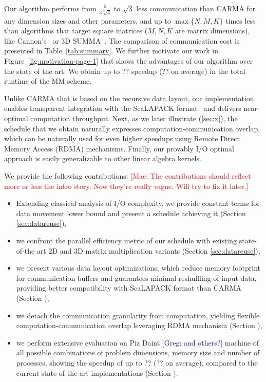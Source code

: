 \documentclass[sigplan,review,anonymous]{acmart}\settopmatter{printfolios=true,printccs=false,printacmref=false}
\newcommand\greg[1]{\textcolor{blue}{[Greg: #1]}}
\newcommand\mac[1]{\textcolor{red}{[Mac: #1]}}
\begin{document}
Our algorithm performs from $\frac{5}{3 \sqrt[3]{4}}$ to $\sqrt{3}$ less
communication than CARMA for any dimension sizes and other parameters, and up
to $\max\{N,M,K\}$ times less than algorithms that target square matrices ($M,
N, K$ are matrix dimensions), like Cannon's~\cite{generalCannon} or 3D
SUMMA~\cite{summa}. The comparison of communication cost is presented in
Table~\ref{tab:summary}. 
%
We further motivate our work in Figure~\ref{fig:motivation-page-1} that
shows the advantages of our algorithm over the state of the art.  We
obtain up to ?? speedup (?? on average) in the total runtime of the MM scheme.

Unlike CARMA that is based on the recursive data layout, our implementation
enables transparent integration with the ScaLAPACK format~\cite{cite} and
delivers near-optimal computation throughput.
%
Next, as we later illustrate (\cref{sec:x}), the schedule that we obtain
naturally expresses computation-communication overlap, which can be naturally
used for even higher speedups using Remote Direct Memory Access (RDMA)
mechanisms.
%
Finally, our provably I/O optimal approach is easily generalizable to other
linear algebra kernels. 

We provide the following contributions:
\mac{The contributions should reflect more or less the intro story.
Now they're really vague. Will try to fix it later.}

\begin{itemize}[leftmargin=1em]
%
\item Extending classical analysis of I/O complexity, we provide 
constant terms for data movement lower bound and present a schedule 
achieving it (Section \ref{sec:datareuse}),
%
\item we confront the parallel efficiency metric of our schedule with 
existing state-of-the art 2D and 3D matrix multiplication variants 
(Section \ref{sec:datareuse}),
%
\item we present various data layout optimizations, which reduce memory 
footprint for communication buffers and guarantees minimal reshuffling 
of input data, providing better compatibility with ScaLAPACK format 
than CARMA (Section \label{sec:implementation}),
%
\item we detach the communication granularity from computation, 
yielding flexible computation-communication overlap leveraging RDMA 
mechanism (Section \label{sec:implementation}),
%
\item we perform extensive evaluation on Piz Daint \greg{and others?} 
machine of all possible combinations of problem dimensions, memory size 
and number of processes, showing the speedup of up to ?? (?? on average), 
compared to the current state-of-the-art implementations
(Section \label{sec:evaluation}).
%
\end{itemize}
\end{document}
